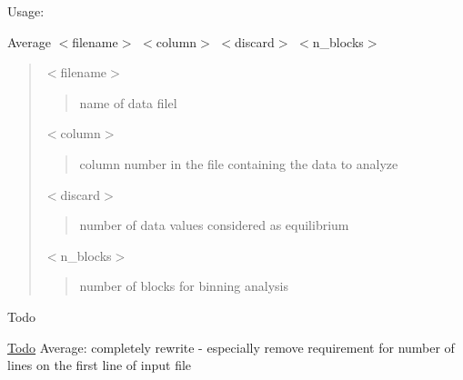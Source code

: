 Usage\+:

{\ttfamily Average $<$filename$>$ $<$column$>$ $<$discard$>$ $<$n\+\_\+blocks$>$}

\begin{quote}
{\ttfamily $<$filename$>$} \begin{quote}
name of data filel \end{quote}
{\ttfamily $<$column$>$} \begin{quote}
column number in the file containing the data to analyze \end{quote}
{\ttfamily $<$discard$>$} \begin{quote}
number of data values considered as equilibrium \end{quote}
{\ttfamily $<$n\+\_\+blocks$>$} \begin{quote}
number of blocks for binning analysis \end{quote}
\end{quote}


\begin{DoxyRefDesc}{Todo}
\item[\hyperlink{todo__todo000008}{Todo}]Average\+: completely rewrite -\/ especially remove requirement for number of lines on the first line of input file \end{DoxyRefDesc}

